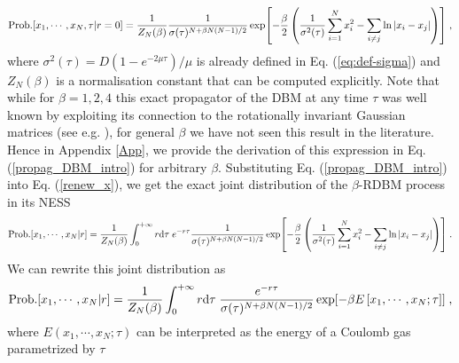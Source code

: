 \documentclass[onecolumn,superscriptaddress,
 amsmath,amssymb,
 aps,
 prd,
]{revtex4-1}
\newcommand{\bea}{\begin{eqnarray}}
\newcommand{\eea}{\end{eqnarray}}
\begin{document}
\bea \label{propag_DBM_intro}
{\rm Prob.}[x_1,\cdots, x_N, \tau \vert r = 0]= \frac{1}{Z_N(\beta)}
\frac{1}{\sigma(\tau)^{N + \beta N(N-1)/2}} \exp[ -\frac{\beta}{2}\left(\frac{1}{\sigma^2(\tau)} \sum_{i = 1}^N x_i^2 - \sum_{i \neq j} \ln |x_i - x_j| \right)] \;,
\eea
where $\sigma^2(\tau) = {D (1 - e^{-2 \mu \tau})}/{\mu}$ is already defined in Eq. (\ref{eq:def-sigma}) and $Z_N(\beta)$ is a normalisation constant that can be computed explicitly. Note that while for $\beta = 1,2,4$ this exact propagator of the DBM at any time $\tau$ was well known by exploiting its connection to the rotationally invariant Gaussian matrices (see e.g. \cite{F10}), for general $\beta$ we have not seen this result in the literature. Hence in Appendix \ref{App}, we provide the derivation of this expression in Eq. (\ref{propag_DBM_intro}) for arbitrary $\beta$. Substituting Eq. (\ref{propag_DBM_intro}) into Eq. (\ref{renew_x}), we get the exact joint distribution of the $\beta$-RDBM process in its NESS
\begin{equation} \label{eq:eigenvalues-jpdf}
{\rm Prob.}[x_1, \cdots, x_N | r ] = \frac{1}{Z_N(\beta)} \int_0^{+\infty} r \dd\tau\; e^{-r\tau} \frac{1}{\sigma(\tau)^{N + \beta N(N-1)/2}} \exp[ -\frac{\beta}{2}\left(\frac{1}{\sigma^2(\tau)} \sum_{i = 1}^N x_i^2 - \sum_{i \neq j} \ln |x_i - x_j| \right)] \;.
\end{equation}
We can rewrite this joint distribution as 
\begin{equation}\label{eq:eigenvalues-jpdf-E}
{\rm Prob.}[x_1, \cdots, x_N | r] = \frac{1}{Z_N(\beta)} \int_0^{+\infty} r \dd \tau \;  \frac{e^{-r \tau}}{\sigma(\tau)^{N + \beta N(N-1)/2}} \exp[ - \beta E\left[ x_1, \cdots, x_N; \tau \right] ] \;,
\end{equation}
where $E(x_1, \cdots, x_N; \tau)$ can be interpreted as the energy of a Coulomb gas parametrized by $\tau$ 
\end{document}
